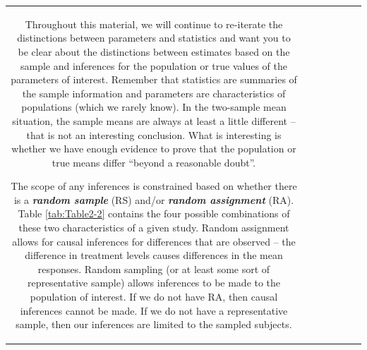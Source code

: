 \documentclass[]{book}
\theoremstyle{definition}
\theoremstyle{definition}
\theoremstyle{remark}
\begin{document}
\begin{longtable}[]{@{}ccccccc@{}}
\begin{minipage}[b]{0.10\columnwidth}
Throughout this material, we will continue to re-iterate the
distinctions between parameters and statistics and want you to be clear
about the distinctions between estimates based on the sample and
inferences for the population or true values of the parameters of
interest. Remember that statistics are summaries of the sample
information and parameters are characteristics of populations (which we
rarely know). In the two-sample mean situation, the sample means are
always at least a little different -- that is not an interesting
conclusion. What is interesting is whether we have enough evidence to
prove that the population or true means differ ``beyond a reasonable
doubt''.

The scope of any inferences is constrained based on whether there is a
\textbf{\emph{random sample}} (RS) and/or \textbf{\emph{random
assignment}} (RA). Table \ref{tab:Table2-2} contains the four possible
combinations of these two characteristics of a given study. Random
assignment allows for causal inferences for differences that are
observed -- the difference in treatment levels causes differences in the
mean responses. Random sampling (or at least some sort of representative
sample) allows inferences to be made to the population of interest. If
we do not have RA, then causal inferences cannot be made. If we do not
have a representative sample, then our inferences are limited to the
sampled subjects.

\footnotesize




\end{minipage}
\end{longtable}
\end{document}
